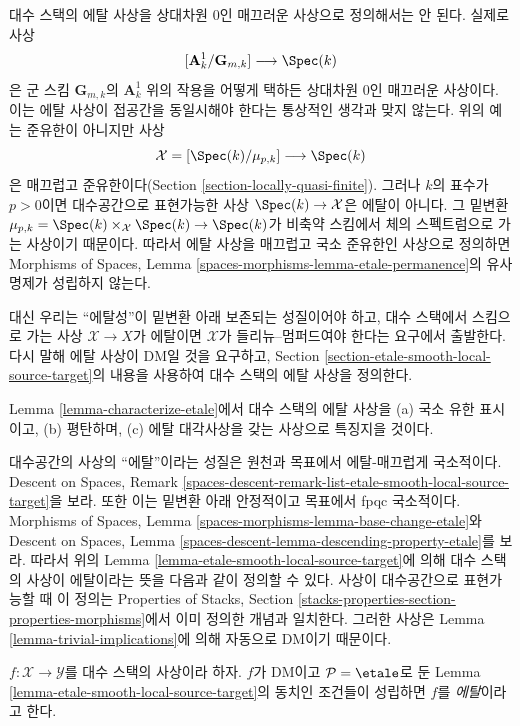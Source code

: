 \noindent
대수 스택의 에탈 사상을 상대차원 $0$인 매끄러운 사상으로 정의해서는
안 된다. 실제로 사상
$$
[\mathbf{A}^1_k/\mathbf{G}_{m, k}] \longrightarrow \Spec(k)
$$
은 군 스킴 $\mathbf{G}_{m, k}$의 $\mathbf{A}^1_k$ 위의 작용을 어떻게
택하든 상대차원 $0$인 매끄러운 사상이다. 이는 에탈 사상이 접공간을
동일시해야 한다는 통상적인 생각과 맞지 않는다. 위의 예는 준유한이
아니지만 사상
$$
\mathcal{X} = [\Spec(k)/\mu_{p, k}] \longrightarrow \Spec(k)
$$
은 매끄럽고 준유한이다(Section \ref{section-locally-quasi-finite}). 그러나
$k$의 표수가 $p > 0$이면 대수공간으로 표현가능한 사상
$\Spec(k) \to \mathcal{X}$은 에탈이 아니다. 그 밑변환
$\mu_{p, k} = \Spec(k) \times_\mathcal{X} \Spec(k) \to \Spec(k)$가
비축약 스킴에서 체의 스펙트럼으로 가는 사상이기 때문이다. 따라서 에탈
사상을 매끄럽고 국소 준유한인 사상으로 정의하면 Morphisms of Spaces,
Lemma \ref{spaces-morphisms-lemma-etale-permanence}의 유사 명제가 성립하지
않는다.

\medskip\noindent
대신 우리는 ``에탈성''이 밑변환 아래 보존되는 성질이어야 하고, 대수
스택에서 스킴으로 가는 사상 $\mathcal{X} \to X$가 에탈이면
$\mathcal{X}$가 들리뉴--멈퍼드여야 한다는 요구에서 출발한다. 다시 말해
에탈 사상이 DM일 것을 요구하고, Section
\ref{section-etale-smooth-local-source-target}의 내용을 사용하여 대수
스택의 에탈 사상을 정의한다.

\medskip\noindent
Lemma \ref{lemma-characterize-etale}에서 대수 스택의 에탈 사상을
(a) 국소 유한 표시이고, (b) 평탄하며, (c) 에탈 대각사상을 갖는 사상으로
특징지을 것이다.

\medskip\noindent
대수공간의 사상의 ``에탈''이라는 성질은 원천과 목표에서 에탈-매끄럽게
국소적이다. Descent on Spaces, Remark
\ref{spaces-descent-remark-list-etale-smooth-local-source-target}을 보라.
또한 이는 밑변환 아래 안정적이고 목표에서 fpqc 국소적이다. Morphisms of
Spaces, Lemma \ref{spaces-morphisms-lemma-base-change-etale}와 Descent on
Spaces, Lemma \ref{spaces-descent-lemma-descending-property-etale}를 보라.
따라서 위의 Lemma \ref{lemma-etale-smooth-local-source-target}에 의해
대수 스택의 사상이 에탈이라는 뜻을 다음과 같이 정의할 수 있다.
사상이 대수공간으로 표현가능할 때 이 정의는 Properties of Stacks,
Section \ref{stacks-properties-section-properties-morphisms}에서 이미 정의한
개념과 일치한다. 그러한 사상은 Lemma \ref{lemma-trivial-implications}에
의해 자동으로 DM이기 때문이다.

\begin{definition}
\label{definition-etale}
$f : \mathcal{X} \to \mathcal{Y}$를 대수 스택의 사상이라 하자.
$f$가 DM이고 $\mathcal{P} = \etale$로 둔 Lemma
\ref{lemma-etale-smooth-local-source-target}의 동치인 조건들이 성립하면
$f$를 {\it 에탈}이라고 한다.
\end{definition}


